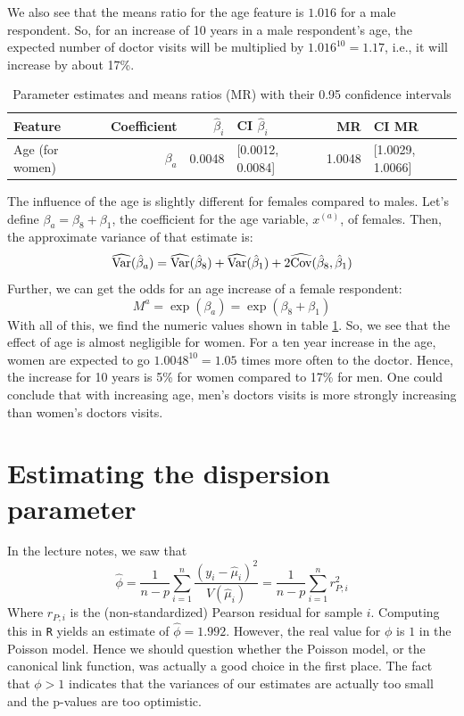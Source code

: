 \documentclass[a4paper,11pt]{article}
\begin{document}
We also see that the means ratio for the age feature is $1.016$ for a male respondent. So, for an increase of 10 years in a male respondent's age, the expected number of doctor visits will be multiplied by $1.016^{10} = 1.17$, i.e., it will increase by about 17\%. 

\begin{table}[h]
\centering
\begin{tabular}{|l|r|r|l|r|l|}
\hline
Feature & Coefficient & $\hat{\beta}_i$ & CI $\hat{\beta}_i$ & MR & CI MR\\
\hline
         Age (for women)& $\beta_a $ & 0.0048&[0.0012, 0.0084]& 1.0048 &[1.0029, 1.0066] \\
\hline
 \end{tabular}
 \caption{\label{tab:femal_age}Parameter estimates and means ratios (MR)
             with their 0.95 confidence intervals}
\end{table}

The influence of the age is slightly different for females compared to males. Let's define $\beta_a = \beta_8 + \beta_1$, the coefficient for the age variable, $x^{(a)}$, of females. Then, the approximate variance of that estimate is:
\begin{equation}
\widehat{\mathrm{Var}}(\hat{\beta}_a) = \widehat{\mathrm{Var}}(\hat{\beta}_8) + \widehat{\mathrm{Var}}(\hat{\beta}_1) + 2 \widehat{\mathrm{Cov}}(\hat{\beta}_8, \hat{\beta}_1)
\end{equation}
Further, we can get the odds for an age increase of a female respondent:
\begin{equation}
M^a = \exp(\beta_a) = \exp(\beta_8 + \beta_1)
\end{equation}
With all of this, we find the numeric values shown in table \ref{tab:femal_age}.
So, we see that the effect of age is almost negligible for women. For a ten year increase in the age, women are expected to go $1.0048^{10} = 1.05$ times more often to the doctor. Hence, the increase for 10 years is 5\% for women compared to 17\% for men. One could conclude that with increasing age, men's doctors visits is more strongly increasing than women's doctors visits.

\section{Estimating the dispersion parameter}
In the lecture notes, we saw that 
\begin{equation}
\widehat{\phi} = \frac{1}{n-p} \sum_{i=1}^n \frac{(y_i- \hat{\mu}_i)^2}{V(\hat{\mu}_i)} = \frac{1}{n-p} \sum_{i=1}^n r_{P;i}^2
\end{equation}
Where $r_{P;i}$ is the (non-standardized) Pearson residual for sample $i$. Computing this in \texttt{R} yields an estimate of $\hat{\phi} = 1.992$. However, the real value for $\phi$ is $1$ in the Poisson model. Hence we should question whether the Poisson model, or the canonical link function, was actually a good choice in the first place. The fact that $\phi > 1$ indicates that the variances of our estimates are actually too small and the p-values are too optimistic.
\end{document}
